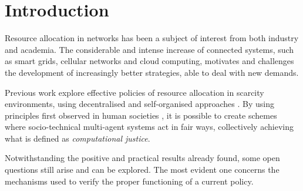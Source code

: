 \documentclass[conference,compsoc]{IEEEtran}
\begin{document}
\maketitle

\begin{abstract}

\end{abstract}





%
\IEEEpeerreviewmaketitle


\maketitle

\section{Introduction}

Resource allocation in networks has been a subject of interest from both industry and academia. The considerable and intense increase of connected systems, such as smart grids, cellular networks and cloud computing, motivates and challenges the development of increasingly better strategies, able to deal with new demands.

Previous work explore effective policies of resource allocation in scarcity environments, using decentralised and self-organised approaches \cite{Pitt2012Distributive,Pitt2015Pursuit}. By using principles first observed in human societies \cite{Ostrom1990}, it is possible to create schemes where socio-technical multi-agent systems act in fair ways, collectively achieving what is defined as \emph{computational justice}.

Notwithstanding the positive and practical results already found, some open questions still arise and can be explored. The most evident one concerns the mechanisms used to verify the proper functioning of a current policy.
\end{document}

